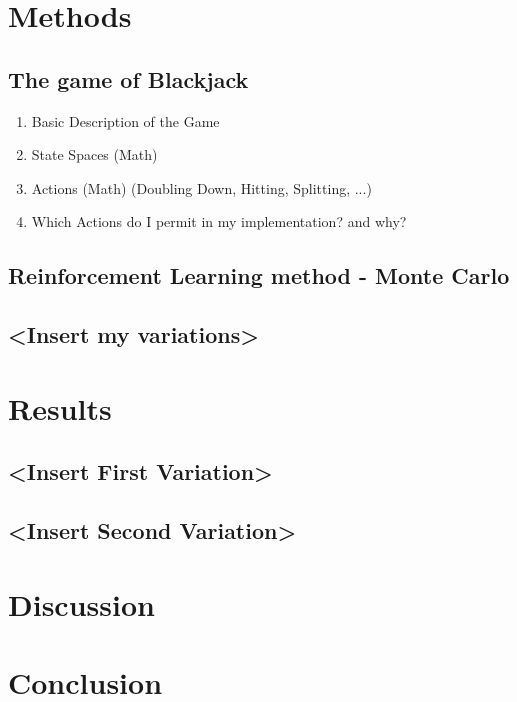 \documentclass[conference]{IEEEtran}
\begin{document}
\section{Methods}

\subsection{The game of Blackjack}
\begin{enumerate}
	\item Basic Description of the Game
	\item State Spaces (Math)
	\item Actions (Math) (Doubling Down, Hitting, Splitting, ...)
	\item Which Actions do I permit in my implementation? and why?
\end{enumerate}

\subsection{Reinforcement Learning method - Monte Carlo}

\subsection{<Insert my variations>}



\section{Results}


\subsection{<Insert First Variation>}

\subsection{<Insert Second Variation>}


\section{Discussion}


\section{Conclusion}
\end{document}

